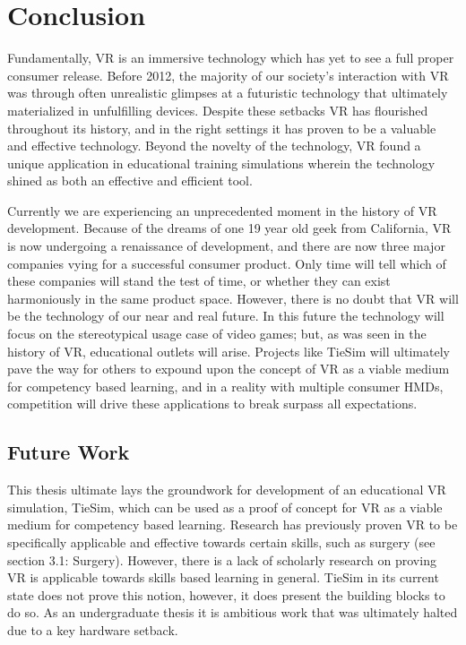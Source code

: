 \chapter{Conclusion}
\label{chap:conclusion}

Fundamentally, VR is an immersive technology which has yet to see a full proper consumer release. Before 2012, the majority of our society's interaction with VR was through often unrealistic glimpses at a futuristic technology that ultimately materialized in unfulfilling devices. Despite these setbacks VR has flourished throughout its history, and in the right settings it has proven to be a valuable and effective technology. Beyond the novelty of the technology, VR found a unique application in educational training simulations wherein the technology shined as both an effective and efficient tool. 

Currently we are experiencing an unprecedented moment in the history of VR development. Because of the dreams of one 19 year old geek from California, VR is now undergoing a renaissance of development, and there are now three major companies vying for a successful consumer product. Only time will tell which of these companies will stand the test of time, or whether they can exist harmoniously in the same product space. However, there is no doubt that VR will be the technology of our near and real future. In this future the technology will focus on the stereotypical usage case of video games; but, as was seen in the history of VR, educational outlets will arise. Projects like TieSim will ultimately pave the way for others to expound upon the concept of VR as a viable medium for competency based learning, and in a reality with multiple consumer HMDs, competition will drive these applications to break surpass all expectations. 

\section{Future Work}
\label{sec:futurework}

This thesis ultimate lays the groundwork for development of an educational VR simulation, TieSim, which can be used as a proof of concept for VR as a viable medium for competency based learning. Research has previously proven VR to be specifically applicable and effective towards certain skills, such as surgery (see section 3.1: Surgery). However, there is a lack of scholarly research on proving VR is applicable towards skills based learning in general. TieSim in its current state does not prove this notion, however, it does present the building blocks to do so. As an undergraduate thesis it is ambitious work that was ultimately halted due to a key hardware setback. 

